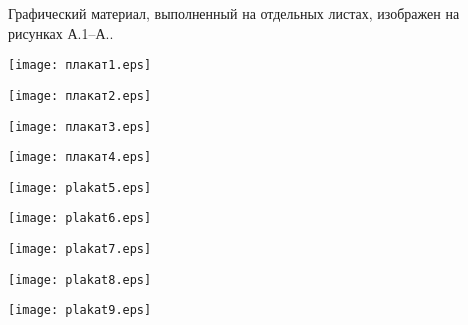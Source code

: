 
Графический материал, выполненный на отдельных листах,
изображен на рисунках А.1--А..
\setcounter{числоПлакатов}{0}

\renewcommand{\thefigure}{А.\arabic{figure}} %

\begin{landscape}

\begin{плакат}
    \texttt{[image: плакат1.eps]}
    \label{pl1:image}      
\end{плакат}

\begin{плакат}
    \texttt{[image: плакат2.eps]}
    \label{pl2:image}      
\end{плакат}

\begin{плакат}
    \texttt{[image: плакат3.eps]}
    \label{pl3:image}      
\end{плакат}

\begin{плакат}
    \texttt{[image: плакат4.eps]}
    \label{pl4:image}      
\end{плакат}

\begin{плакат}
	\texttt{[image: plakat5.eps]}
	\label{pl5:image}      
\end{плакат}

\begin{плакат}
	\texttt{[image: plakat6.eps]}
	\label{pl6:image}      
\end{плакат}

\begin{плакат}
	\texttt{[image: plakat7.eps]}
	\label{pl7:image}      
\end{плакат}

\begin{плакат}
	\texttt{[image: plakat8.eps]}
	\label{pl8:image}      
\end{плакат}

\begin{плакат}
	\texttt{[image: plakat9.eps]}
	\label{pl9:image}      
\end{плакат}

\end{landscape}
